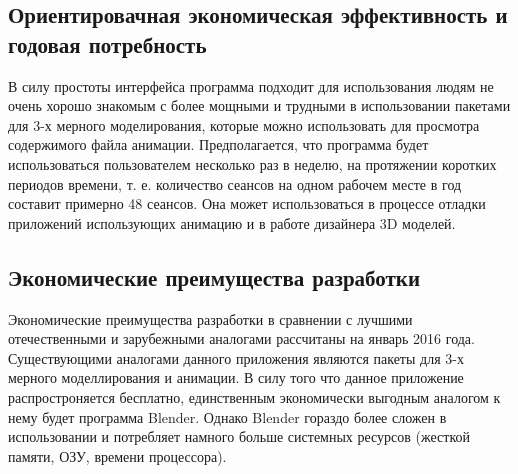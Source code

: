 \subsection{Ориентировачная экономическая эффективность и годовая потребность}
В силу простоты интерфейса программа подходит для использования людям не очень хорошо знакомым с более мощными и трудными в использовании пакетами для 3-х мерного моделирования, которые можно использовать для просмотра содержимого файла анимации.
Предполагается, что программа будет использоваться пользователем несколько раз в неделю, на протяжении коротких периодов времени, т. е. количество сеансов на одном рабочем месте в год составит примерно 48 сеансов. Она может использоваться в процессе отладки приложений использующих анимацию и в работе дизайнера 3D моделей.

\subsection{Экономические преимущества разработки}
Экономические преимущества разработки в сравнении с лучшими отечественными и зарубежными аналогами рассчитаны на январь 2016 года. Существующими аналогами данного приложения являются пакеты для 3-х мерного моделлирования и анимации. В силу того что данное приложение распростроняется бесплатно, единственным экономически выгодным аналогом к нему будет программа Blender. Однако Blender гораздо более сложен в использовании и потребляет намного больше системных ресурсов (жесткой памяти, ОЗУ, времени процессора).
